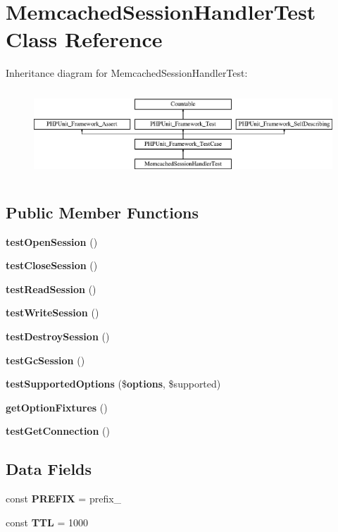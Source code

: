 \section{Memcached\+Session\+Handler\+Test Class Reference}
\label{class_symfony_1_1_component_1_1_http_foundation_1_1_tests_1_1_session_1_1_storage_1_1_handler_1_1d9c59a749ccdd37a60c5e102a4f503b}
Inheritance diagram for Memcached\+Session\+Handler\+Test\+:\begin{figure}[H]
\begin{center}
\leavevmode
\includegraphics[height=3.303835cm]{class_symfony_1_1_component_1_1_http_foundation_1_1_tests_1_1_session_1_1_storage_1_1_handler_1_1d9c59a749ccdd37a60c5e102a4f503b}
\end{center}
\end{figure}
\subsection*{Public Member Functions}
\begin{DoxyCompactItemize}
\item 
{\bf test\+Open\+Session} ()
\item 
{\bf test\+Close\+Session} ()
\item 
{\bf test\+Read\+Session} ()
\item 
{\bf test\+Write\+Session} ()
\item 
{\bf test\+Destroy\+Session} ()
\item 
{\bf test\+Gc\+Session} ()
\item 
{\bf test\+Supported\+Options} (\${\bf options}, \$supported)
\item 
{\bf get\+Option\+Fixtures} ()
\item 
{\bf test\+Get\+Connection} ()
\end{DoxyCompactItemize}
\subsection*{Data Fields}
\begin{DoxyCompactItemize}
\item 
const {\bf P\+R\+E\+F\+I\+X} = \textquotesingle{}prefix\+\_\+\textquotesingle{}
\item 
const {\bf T\+T\+L} = 1000
\end{DoxyCompactItemize}
